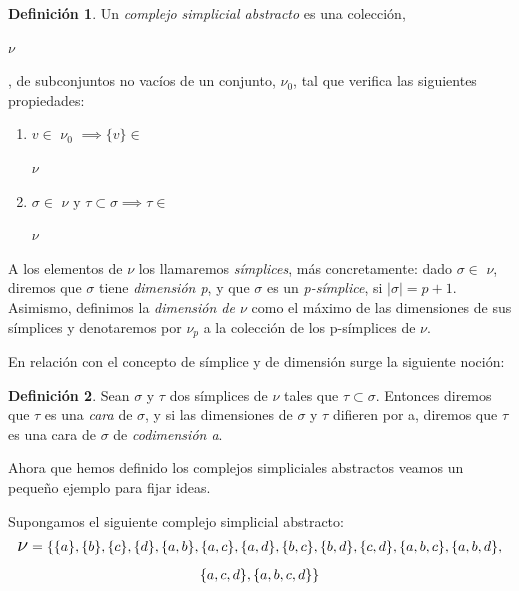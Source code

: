 \documentclass[12pt]{article}
\numberwithin{equation}{section}
\theoremstyle{definition}
\newtheorem{defi}{Definición}
\newenvironment{ejem}
  {\pushQED{\qed}\renewcommand{\qedsymbol}{$\blacktriangleleft$}\ejemplo}
  {\popQED\endejemplo}
\theoremstyle{remark}
\theoremstyle{plain}
\begin{document}
	\begin{defi}
	
	Un \textit{complejo simplicial abstracto} es una colección, 
	\begin{Large}$\nu$\end{Large}, de subconjuntos no vacíos de un 
	conjunto, {\Large $\nu$}$_{0}$, tal que verifica las siguientes 
	propiedades:
	
	\begin{enumerate}
		\item $v \in $ {\Large $ \nu$}$_{0}$ $ \implies \{v\} \in$
			\begin{Large}$ \nu$\end{Large}
		\item $ \sigma \in $ {\Large $ \nu$}$ \text{ y } \tau \subset 
			\sigma \implies \tau \in $
			\begin{Large}$ \nu$\end{Large}
	\end{enumerate}
	
	A los elementos de {\Large $\nu$} los llamaremos \textit{símplices},
	más concretamente: dado $\sigma \in $ {\Large $\nu$}, diremos que 
	$\sigma$ tiene \textit{dimensión p}, y que $\sigma$ es un 
	\textit{p-símplice}, si $|\sigma|=p+1$. Asimismo, definimos la 
	\textit{dimensión de {\Large $\nu$}} como el máximo de las dimensiones 
	de sus símplices y denotaremos por {\Large $\nu$}$_{p}$ a la colección 
	de los p-símplices de {\Large $\nu$}.	
	
	\end{defi}
	
	En relación con el concepto de símplice y de dimensión surge la 
	siguiente noción: 

	\begin{defi}
		Sean $\sigma$ y $\tau$ dos símplices de {\Large $\nu$} tales 
		que $\tau \subset \sigma$. Entonces diremos que $\tau$ es una 
		\textit{cara} de $\sigma$, y si las dimensiones de $\sigma$ y 
		$\tau$ difieren por a, diremos que $\tau$ es una cara de 
		$\sigma$ de \textit{codimensión a}.
	\end{defi}

	Ahora que hemos definido los complejos simpliciales abstractos veamos 
	un pequeño ejemplo para fijar ideas.

	\begin{ejem}
		Supongamos el siguiente complejo simplicial abstracto:
		\begin{multline*} 
			\text{{\Large $\nu$}}=\{\{a\},\{b\},\{c\},\{d\},
			\{a,b\},\{a,c\},\{a,d\},\{b,c\},\{b,d\},\{c,d\},
			\{a,b,c\},\{a,b,d\},\\
			\{a,c,d\},\{a,b,c,d\}\}
		\end{multline*}
	\end{ejem}
	
\end{document}
